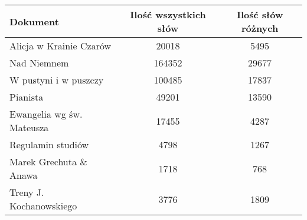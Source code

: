 \documentclass[a4paper]{article}
\begin{document}
\begin{table}
\begin{tabular}{|l|c|c|}
\hline
\textbf{Dokument}         & \textbf{Ilość wszystkich słów} & \textbf{Ilość słów różnych} \\ \hline
Alicja w Krainie Czarów   & 20018                          & 5495                        \\ \hline
Nad Niemnem               & 164352                         & 29677                       \\ \hline
W pustyni i w puszczy     & 100485                         & 17837                       \\ \hline
Pianista                  & 49201                          & 13590                       \\ \hline
Ewangelia wg św. Mateusza & 17455                          & 4287                        \\ \hline
Regulamin studiów         & 4798                           & 1267                        \\ \hline
Marek Grechuta \& Anawa   & 1718                           & 768                         \\ \hline
Treny J. Kochanowskiego   & 3776                           & 1809                        \\ \hline
\end{tabular}
\end{table}
\end{document}
